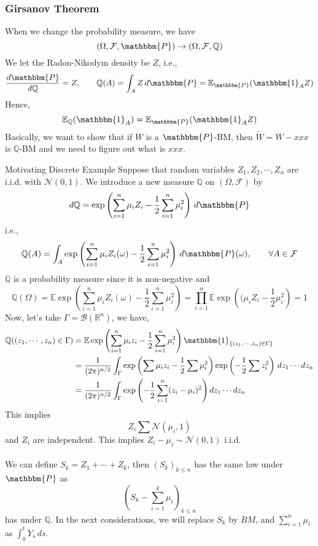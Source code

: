 \documentclass[12pt,a4paper]{article}
\newcommand{\R}{\mathbb{R}}
\newcommand{\Q}{\mathbb{Q}}
\newcommand{\E}{\mathbb{E}}
\begin{document}
    \subsubsection{Girsanov Theorem}
    When we change the probability measure, we have
    $$
    (\Omega,\mathcal{F}, \mathbbm{P})\to (\Omega, \mathcal{F}, \Q)
    $$
    We let the Radon-Nikodym density be $Z$, i.e.,
    $$
    \frac{d\mathbbm{P}}{d\Q} = Z,\qquad \Q(A) = \int_A Z\, d\mathbbm{P} = \E_{\mathbbm{P}}(\mathbbm{1}_A Z)
    $$
    Hence,
    $$
    \E_{\Q}(\mathbbm{1}_A) = \E_{\mathbbm{P}}(\mathbbm{1}_AZ)
    $$
    Basically, we want to show that if $W$ is a $\mathbbm{P}$-BM, then $\tilde W = W-xxx$ is $\Q$-BM and we need to figure out what is $xxx$.
    \begin{example}{Motivating Discrete Example}{}
        Suppose that random variables $Z_1,Z_2,\cdots, Z_n$ are i.i.d. with $\mathcal{N}(0,1)$. We introduce a new measure $\Q$ on $(\Omega,\mathcal{F})$ by
        $$
        d\Q = \exp\left(\sum_{i=1}^n \mu_i Z_i - \frac{1}{2}\sum_{i=1}^n \mu_i^2\right)\, d\mathbbm{P}
        $$
        i.e.,
        $$
        \Q(A) = \int_A \exp\left(\sum_{i=1}^n \mu_i Z_i(\omega) - \frac{1}{2}\sum_{i=1}^n \mu_i^2\right)\, d\mathbbm{P}(\omega),\qquad\forall A\in\mathcal{F}
        $$
        $\Q$ is a probability measure since it is non-negative and
        $$
        \Q(\Omega) = \E\exp\left(\sum_{i=1}^n \mu_i Z_i(\omega) - \frac{1}{2}\sum_{i=1}^n \mu_i^2\right) = \prod_{i=1}^n\E \exp\left((\mu_iZ_i-\frac{1}{2}\mu_i^2\right)  =1
        $$
        Now, let's take $\Gamma = \mathcal{B}(\R^n)$,  we have,
        \begin{align*}
            \Q((z_1,\cdots,z_n)\in\Gamma) &= \E\exp\left(\sum_{i=1}^n \mu_iz_i - \frac{1}{2}\sum_{i=1}^n \mu_i^2\right)\mathbbm{1}_{\{(z_1,\cdots,z_n)\in\Gamma\}}\\
            &= \frac{1}{(2\pi)^{n/2}}\int_\Gamma \exp\left(\sum \mu_iz_i - \frac{1}{2}\sum\mu_i^2\right)\exp\left(-\frac{1}{2}\sum z_i^2\right)\,dz_1\cdots dz_n\\
            &= \frac{1}{(2\pi)^{n/2}} \int_\Gamma \exp\left(-\frac{1}{2}\sum_{i=1}^n(z_i-\mu_i)^2\right)dz_1\cdots dz_n
        \end{align*}
        This implies
        $$
        Z_i\sum \mathcal{N}(\mu_i,1)
        $$
        and $Z_i$ are independent. This implies $Z_i-\mu_i\sim \mathcal{N}(0,1)$ i.i.d.\\
        \\
        We can define $S_k = Z_1 + \cdots + Z_k$, then $(S_k)_{k\le n}$ has the same law under $\mathbbm{P}$ as
        $$
        (S_k - \sum_{i=1}^k\mu_i)_{k\le n}
        $$
        has under $\Q$. In the next considerations, we will replace $S_k$ by $BM$, and $\sum_{i=1}^n \mu_i$ as $\int_0^t Y_s\, ds$.
    \end{example}
\end{document}
